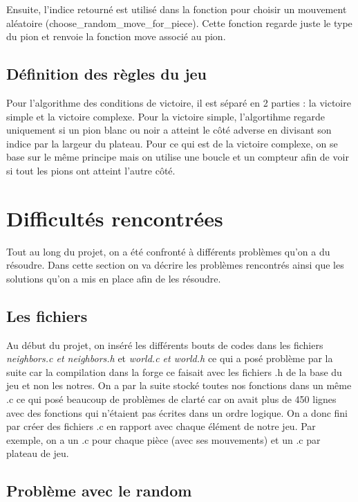 \documentclass{article}
\begin{document}
 Ensuite, l'indice retourné est utilisé dans la fonction pour choisir un mouvement aléatoire (choose\_random\_move\_for\_piece). Cette fonction regarde juste le type du pion et renvoie la fonction move associé au pion.

 \subsection{Définition des règles du jeu}

 Pour l'algorithme des conditions de victoire, il est séparé en 2 parties : la victoire simple et la victoire complexe. Pour la victoire simple, l'algortihme regarde uniquement si un pion blanc ou noir a atteint le côté adverse en divisant son indice par la largeur du plateau. Pour ce qui est de la victoire complexe, on se base sur le même principe mais on utilise une boucle et un compteur afin de voir si tout les pions ont atteint l'autre côté.


\section{Difficultés rencontrées}

Tout au long du projet, on a été confronté à différents problèmes qu'on a du résoudre. Dans cette section on va décrire les problèmes rencontrés ainsi que les solutions qu'on a mis en place afin de les résoudre.

\subsection{Les fichiers}

Au début du projet, on inséré les différents bouts de codes dans les fichiers \textit{neighbors.c et neighbors.h} et \textit{world.c et world.h} ce qui a posé problème par la suite car la compilation dans la forge ce faisait avec les fichiers .h de la base du jeu et non les notres. On a par la suite stocké toutes nos fonctions dans un même .c ce qui posé beaucoup de problèmes de clarté car on avait plus de 450 lignes avec des fonctions qui n'étaient pas écrites dans un ordre logique. On a donc fini par créer des fichiers .c en rapport avec chaque élément de notre jeu. Par exemple, on a un .c pour chaque pièce (avec ses mouvements) et un .c par plateau de jeu.

\subsection{Problème avec le random}
\end{document}
